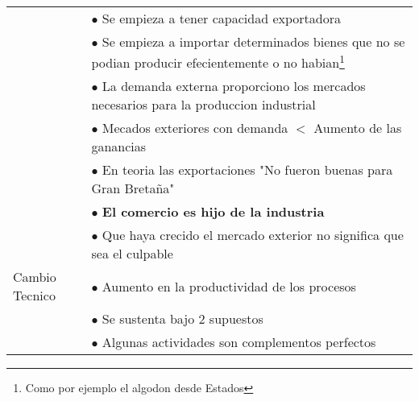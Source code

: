 \begin{tabular}{p{3cm}|p{11cm}}
                               & \vspace{-0.7cm} \hspace{1cm} $\bullet$ Se empieza a tener capacidad exportadora                                                                                                           \\
                               & \vspace{-0.7cm} \hspace{1cm} $\bullet$ Se empieza a importar determinados bienes que no se podian producir efecientemente o no habian\footnote{Como por ejemplo el algodon desde Estados} \\
                               & $\bullet$ La demanda externa proporciono los mercados necesarios para la produccion industrial                                                                                            \\
                               & $\bullet$ Mecados exteriores con demanda $<$ Aumento de las ganancias                                                                                                                     \\
                               & $\bullet$ En teoria las exportaciones "No fueron buenas para Gran Bretaña"                                                                                                                \\
                               & $\bullet$ {\bf El comercio es hijo de la industria}                                                                                                                                       \\
                               & $\bullet$ Que haya crecido el mercado exterior no significa que sea el culpable                                                                                                           \\ \hline
  Cambio    Tecnico            & $\bullet$ Aumento en la productividad de los procesos                                                                                                                                     \\
                               & $\bullet$ Se sustenta bajo 2 supuestos                                                                                                                                                    \\
                               & \hspace{1cm} $\bullet$ Algunas actividades son complementos perfectos                                                                                                                     \\

\end{tabular}
